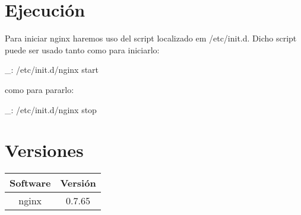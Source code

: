\section{Ejecución}

Para iniciar nginx haremos uso del script localizado em /etc/init.d. Dicho script puede ser usado tanto como para iniciarlo:

\begin{bashcode}
_: /etc/init.d/nginx start
\end{bashcode}

como para pararlo:

\begin{bashcode}
_: /etc/init.d/nginx stop
\end{bashcode}


\section{Versiones}

\begin{tabular}{|c|c|}
   \hline
   Software & Versión \\ \hline
   nginx & 0.7.65 \\ \hline
\end{tabular}
